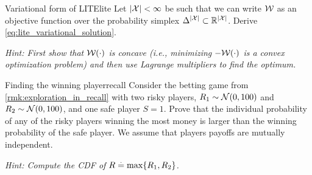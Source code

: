 \begin{nexercise}{Variational form of LITE}{lite}
  Let $\left| \mathcal{X} \right| < \infty$ be such that we can write $\mathcal{W}$ as an objective function over the probability simplex $\Delta^{\left| \mathcal{X} \right|} \subset \mathbb{R}^{\left| \mathcal{X} \right|}$.
  Derive \cref{eq:lite_variational_solution}.\par
  \textit{Hint: First show that $\mathcal{W}(\cdot)$ is concave (i.e., minimizing $-\mathcal{W}(\cdot)$ is a convex optimization problem) and then use Lagrange multipliers to find the optimum.}
\end{nexercise}

\begin{nexercise}{Finding the winning player}{recall}
  Consider the betting game from \cref{rmk:exploration_in_recall} with two risky players, $R_1 \sim \N{0}{100}$ and $R_2 \sim \N{0}{100}$, and one safe player $S = 1$.
  Prove that the individual probability of any of the risky players winning the most money is larger than the winning probability of the safe player.
  We assume that players payoffs are mutually independent.

  \textit{Hint: Compute the CDF of $R \overset{.}{=} \max\{R_1, R_2\}$.}
\end{nexercise}

